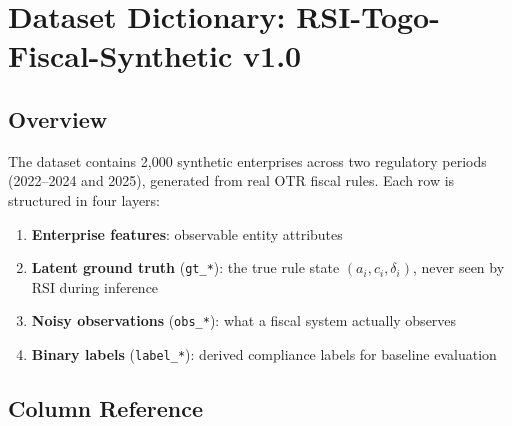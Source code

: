 \newpage
\section{Dataset Dictionary: RSI-Togo-Fiscal-Synthetic v1.0}
\label{app:dataset}

\subsection{Overview}

The dataset contains 2,000 synthetic enterprises across two regulatory
periods (2022--2024 and 2025), generated from real OTR fiscal rules.
Each row is structured in four layers:

\begin{enumerate}[leftmargin=2em]
  \item \textbf{Enterprise features}: observable entity attributes
  \item \textbf{Latent ground truth} (\texttt{gt\_*}): the true rule
        state $(a_i, c_i, \delta_i)$, never seen by RSI during inference
  \item \textbf{Noisy observations} (\texttt{obs\_*}): what a fiscal
        system actually observes
  \item \textbf{Binary labels} (\texttt{label\_*}): derived compliance
        labels for baseline evaluation
\end{enumerate}

\subsection{Column Reference}


